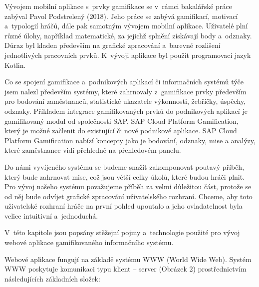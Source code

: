 \documentclass[twoside, 12pt]{article}
\begin{document}
\par

Vývojem mobilní aplikace s~prvky gamifikace se v~rámci bakalářské práce zabýval Pavol Podstrelený (2018).
Jeho práce se zabývá gamifikací, motivací a~typologií hráčů, dále pak samotným vývojem mobilní aplikace.
Uživatelé plní různé úlohy, například matematické, za jejichž splnění získávají body a~odznaky.
Důraz byl kladen především na grafické zpracování a~barevné rozlišení jednotlivých pracovních prvků.
K~vývoji aplikace byl použit programovací jazyk Kotlin.

\par

Co se spojení gamifikace a~podnikových aplikací či informačních systémů týče jsem nalezl především systémy,
které zahrnovaly z~gamifikace prvky především pro bodování zaměstnanců, statistické ukazatele výkonnosti, žebříčky, úspěchy, odznaky.
Příkladem integrace gamifikovaných prvků do podnikových aplikací je gamifikovaný modul od společnosti SAP, SAP Cloud Platform Gamification,
který je možné začlenit do existující či nové podnikové aplikace.
SAP Cloud Platform Gamification nabízí koncepty jako je bodování,
odznaky, mise a analýzy, které zaměstnanec vidí přehledně na přehledovém panelu.

\par
Do námi vyvíjeného systému se budeme snažit zakomponovat poutavý příběh,
který bude zahrnovat mise, což jsou větší celky úkolů, které budou hráči plnit.
Pro vývoj našeho systému považujeme příběh za velmi důležitou část,
protože se od něj bude odvíjet grafické zpracování uživatelského rozhraní.
Chceme, aby toto uživatelské rozhraní hráče na první pohled upoutalo
a jeho ovladatelnost byla velice intuitivní a~jednoduchá.

\par


V~této kapitole jsou popsány stěžejní pojmy a~technologie použité pro vývoj webové aplikace
gamifikovaného informačního systému.

Webové aplikace fungují na základě systému WWW (World Wide Web).
Systém WWW  poskytuje komunikaci typu klient -- server (Obrázek 2)
prostřednictvím následujících základních složek:
\end{document}
